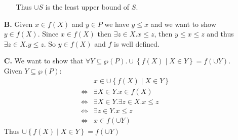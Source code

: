 \begin{exercise}
\begin{enumerate}
\begin{itemize}
                    Thus $\cup S$ is the least upper bound of $S$.
            \end{itemize}
        \item[\textbf{B.}]
            Given $x \in f(X)$ and $y \in P$ we have $y \leq x$ and we want to show $y \in f(X)$. Since $x \in f(X)$ then $\exists z \in X. x \leq z$, then $y \leq x \leq z$ and thus $\exists z \in X. y \leq z$. So $y \in f(X)$ and $f$ is well defined.
        \item[\textbf{C.}]
            We want to show that $\forall Y \subseteq \wp(P). \cup \left\{f(X) \mid X \in Y\right\} = f(\cup Y)$. Given $Y \subseteq \wp(P)$:
            \begin{align*}
                &x \in \cup \left\{f(X) \mid X \in Y\right\} \\
                \iff& \exists X \in Y. x \in f(X) \\
                \iff& \exists X \in Y. \exists z \in X. x \leq z \\
                \iff& \exists z \in Y. x \leq z \\
                \iff& x \in f(\cup Y)
            \end{align*}
            Thus $\cup \left\{f(X) \mid X \in Y\right\} = f(\cup Y)$
    \end{enumerate}
\end{exercise}
